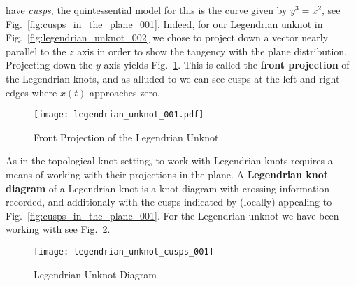     have \textit{cusps}, the quintessential model for this is the curve given
    by $y^{3}=x^{2}$, see Fig.~\ref{fig:cusps_in_the_plane_001}.
    Indeed, for our Legendrian unknot in Fig.~\ref{fig:legendrian_unknot_002}
    we chose to project down a vector nearly parallel to the $z$ axis in order
    to show the tangency with the plane distribution. Projecting down the
    $y$ axis yields Fig.~\ref{fig:legendrian_unknot_001}. This is called the
    \textbf{front projection} of the Legendrian knots, and as alluded to we can
    see cusps at the left and right edges where $\dot{x}(t)$ approaches zero.
    \begin{figure}
        \centering
        \texttt{[image: legendrian\_unknot\_001.pdf]}
        \caption{Front Projection of the Legendrian Unknot}
        \label{fig:legendrian_unknot_001}
    \end{figure}
    \par\hfill\par
    As in the topological knot setting, to work with Legendrian knots requires
    a means of working with their projections in the plane. A
    \textbf{Legendrian knot diagram} of a Legendrian knot is a knot diagram
    with crossing information recorded, and additionaly with the cusps indicated
    by (locally) appealing to Fig.~\ref{fig:cusps_in_the_plane_001}. For
    the Legendrian unknot we have been working with see
    Fig.~\ref{fig:legendrian_unknot_cusps_001}.
    \begin{figure}
        \centering
        \texttt{[image: legendrian\_unknot\_cusps\_001]}
        \caption{Legendrian Unknot Diagram}
        \label{fig:legendrian_unknot_cusps_001}
    \end{figure}
